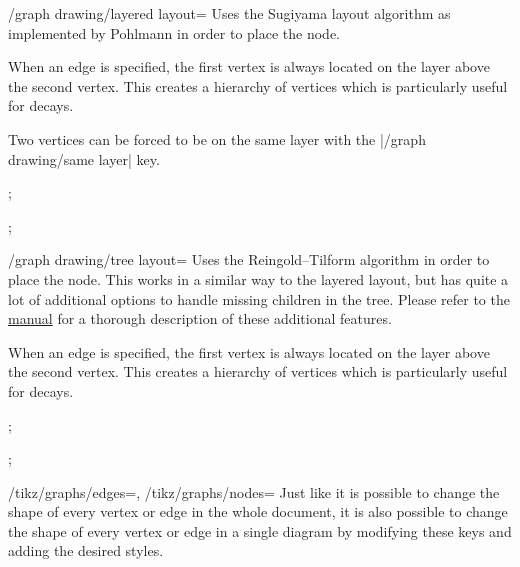 \documentclass[a4paper,final]{ltxdoc}
\providecommand{\pgfmanual}{\href{http://mirrors.ctan.org/graphics/pgf/base/doc/pgfmanual.pdf}{\tikzname{} manual}}
\begin{document}
\begin{codeexample}[execute code=false]
\begin{key}{/graph drawing/layered layout=}
  Uses the Sugiyama layout algorithm \cite{eades1991} as implemented by Pohlmann
  \cite{pohlmann2011} in order to place the node.

  When an edge is specified, the first vertex is always located on the layer
  above the second vertex.  This creates a hierarchy of vertices which is
  particularly useful for decays.

  Two vertices can be forced to be on the same layer with the
  |/graph drawing/same layer| key.

\begin{codeexample}[]
;
\end{codeexample}
\begin{codeexample}[]
;
\end{codeexample}
\end{key}

\begin{key}{/graph drawing/tree layout=}
  Uses the Reingold--Tilform algorithm in order to place the node.  This works
  in a similar way to the layered layout, but has quite a lot of additional
  options to handle missing children in the tree.  Please refer to the
  \pgfmanual{} for a thorough description of these additional features.

  When an edge is specified, the first vertex is always located on the layer
  above the second vertex.  This creates a hierarchy of vertices which is
  particularly useful for decays.

\begin{codeexample}[]
;
\end{codeexample}
\begin{codeexample}[]
;
\end{codeexample}
\end{key}

\begin{keylist}{%
  /tikz/graphs/edges=,
  /tikz/graphs/nodes=}
  Just like it is possible to change the shape of every vertex or edge in the
  whole document, it is also possible to change the shape of every vertex or
  edge in a single diagram by modifying these keys and adding the desired
  styles.
\end{keylist}


\end{codeexample}
\end{document}
